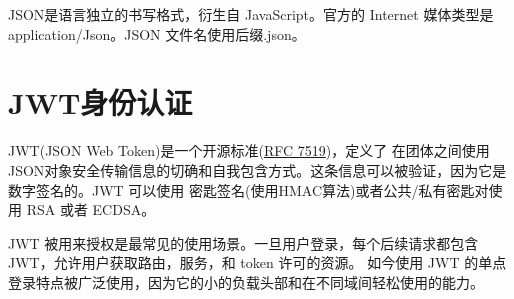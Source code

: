 JSON是语言独立的书写格式，衍生自 JavaScript。官方的 Internet 媒体类型是
application/Json。JSON 文件名使用后缀.json。

\section{JWT身份认证}
JWT(JSON Web Token)\cite{JWT}是一个开源标准(\href{https://tools.ietf.org/html/rfc7519}{RFC 7519})，定义了
在团体之间使用JSON对象安全传输信息的切确和自我包含方式。这条信息可以被验证，因为它是数字签名的。JWT 可以使用
密匙签名(使用HMAC算法)或者公共/私有密匙对使用 RSA 或者 ECDSA。

JWT 被用来授权是最常见的使用场景。一旦用户登录，每个后续请求都包含 JWT，允许用户获取路由，服务，和 token 许可的资源。
如今使用 JWT 的单点登录特点被广泛使用，因为它的小的负载头部和在不同域间轻松使用的能力。





